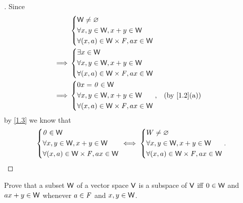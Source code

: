 \begin{proof}[]
	Since
	\begin{align*}
		         & \begin{dcases}
			           \W \neq \varnothing               \\
			           \forall x, y \in \W, x + y \in \W \\
			           \forall (x, a) \in \W \times \F, ax \in \W
		           \end{dcases} \\
		\implies & \begin{dcases}
			           \exists x \in \W                  \\
			           \forall x, y \in \W, x + y \in \W \\
			           \forall (x, a) \in \W \times \F, ax \in \W
		           \end{dcases} \\
		\implies & \begin{dcases}
			           0x = \zv \in \W                   \\
			           \forall x, y \in \W, x + y \in \W \\
			           \forall (x, a) \in \W \times \F, ax \in \W
		           \end{dcases}, &  & \by{1.2}[a]
	\end{align*}
	by \cref{1.3} we know that
	\[
		\begin{dcases}
			\mathit{0} \in \mathsf{W}                        \\
			\forall x, y \in \mathsf{W}, x + y \in \mathsf{W} \\
			\forall (x, a) \in \mathsf{W} \times \mathit{F}, ax \in \mathsf{W}
		\end{dcases} \iff \begin{dcases}
			W \neq \varnothing                \\
			\forall x, y \in \mathsf{W}, x + y \in \mathsf{W} \\
			\forall (x, a) \in \mathsf{W} \times \mathit{F}, ax \in \mathsf{W}
		\end{dcases}.
	\]
\end{proof}

\begin{ex}\label{ex:1.3.18}
	Prove that a subset \(\mathsf{W}\) of a vector space \(\mathsf{V}\) is a subspace of \(\mathsf{V}\) iff \(0 \in \mathsf{W}\) and \(ax + y \in \mathsf{W}\) whenever \(a \in \mathit{F}\) and \(x, y \in \mathsf{W}\).
\end{ex}

